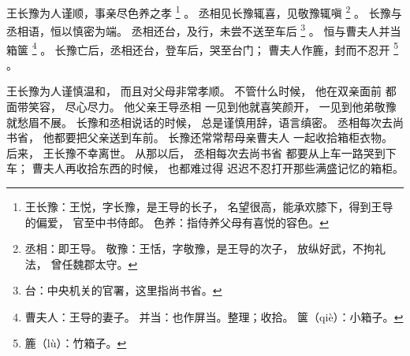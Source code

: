 
\switchcolumn*[\section{}]

王长豫为人谨顺，事亲尽色养之孝%
\footnote{%
    王长豫：王悦，字长豫，是王导的长子，
            名望很高，能承欢膝下，得到王导的偏爱，
            官至中书侍郎。
    色养：指侍养父母有喜悦的容色。
}%
。
丞相见长豫辄喜，见敬豫辄嗔%
\footnote{%
    丞相：即王导。
    敬豫：王恬，字敬豫，是王导的次子，
          放纵好武，不拘礼法，
          曾任魏郡太守。
}%
。
长豫与丞相语，恒以慎密为端。
丞相还台，及行，未尝不送至车后%
\footnote{%
    台：中央机关的官署，这里指尚书省。
}%
。
恒与曹夫人并当箱箧%
\footnote{%
    曹夫人：王导的妻子。
    并当：也作屏当。整理；收拾。
    箧（qiè）：小箱子。
}%
。
长豫亡后，丞相还台，登车后，哭至台门；
曹夫人作簏，封而不忍开%
\footnote{%
    簏（lù）：竹箱子。
}%
。

\switchcolumn

王长豫为人谨慎温和，
而且对父母非常孝顺。
不管什么时候，
他在双亲面前
都面带笑容，
尽心尽力。
他父亲王导丞相
  一见到他就喜笑颜开，
  一见到他弟敬豫就愁眉不展。
长豫和丞相说话的时候，
总是谨慎用辞，语言缜密。
丞相每次去尚书省，
他都要把父亲送到车前。
长豫还常常帮母亲曹夫人
一起收拾箱柜衣物。
后来，
王长豫不幸离世。
从那以后，
丞相每次去尚书省
都要从上车一路哭到下车；
曹夫人再收拾东西的时候，
也都难过得
迟迟不忍打开那些满盛记忆的箱柜。

